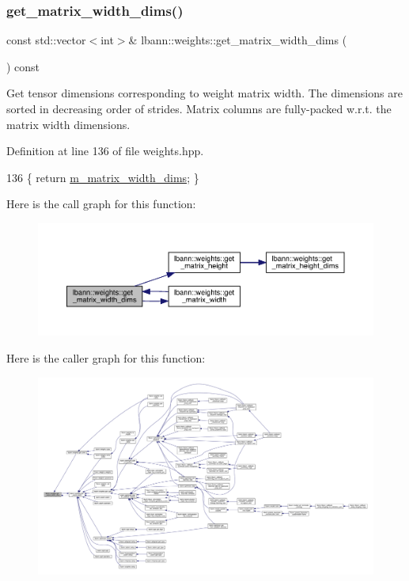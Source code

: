 \subsubsection{\texorpdfstring{get\+\_\+matrix\+\_\+width\+\_\+dims()}{get\_matrix\_width\_dims()}}
{\footnotesize\ttfamily const std\+::vector$<$int$>$\& lbann\+::weights\+::get\+\_\+matrix\+\_\+width\+\_\+dims (\begin{DoxyParamCaption}{ }\end{DoxyParamCaption}) const\hspace{0.3cm}{\ttfamily [inline]}}

Get tensor dimensions corresponding to weight matrix width. The dimensions are sorted in decreasing order of strides. Matrix columns are fully-\/packed w.\+r.\+t. the matrix width dimensions. 

Definition at line 136 of file weights.\+hpp.


\begin{DoxyCode}
136 \{ \textcolor{keywordflow}{return} \hyperlink{classlbann_1_1weights_a8317a198bc5b4cd6bee2c806eefd1f12}{m\_matrix\_width\_dims}; \}
\end{DoxyCode}
Here is the call graph for this function\+:\nopagebreak
\begin{figure}[H]
\begin{center}
\leavevmode
\includegraphics[width=350pt]{classlbann_1_1weights_a783ce38ed0b75c0264dd7e28911d5ec0_cgraph}
\end{center}
\end{figure}
Here is the caller graph for this function\+:\nopagebreak
\begin{figure}[H]
\begin{center}
\leavevmode
\includegraphics[width=350pt]{classlbann_1_1weights_a783ce38ed0b75c0264dd7e28911d5ec0_icgraph}
\end{center}
\end{figure}
\mbox{\label{classlbann_1_1weights_a272f80766f31a5add7a970e5e8fcc352}} 
